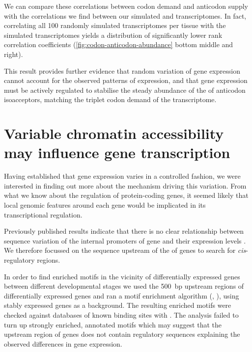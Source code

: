 We can compare these correlations between \mrna codon demand and \trna anticodon
supply with the correlations we find between our simulated \mrna and \trna
transcriptomes. In fact, correlating all \num{100} randomly simulated \trna
transcriptomes per tissue with the simulated \mrna transcriptomes yields a
distribution of significantly lower rank correlation coefficients
(\cref{fig:codon-anticodon-abundance} bottom middle and right).

This result provides further evidence that random variation of \trna gene
expression cannot account for the observed patterns of expression, and that
\trna gene expression must be actively regulated to stabilise the steady
abundance of the of \trna anticodon isoacceptors, matching the triplet codon
demand of the \mrna transcriptome.

\section{Variable chromatin accessibility may influence \trna gene transcription}

Having established that \trna gene expression varies in a controlled fashion, we
were interested in finding out more about the mechanism driving this variation.
From what we know about the regulation of protein-coding genes, it seemed likely
that local genomic features around each \trna gene would be implicated in its
transcriptional regulation.

Previously published results indicate that there is no clear relationship
between sequence variation of the internal promoters of \trna gene and their
expression levels \citep{Oler:2010,Canella:2012}. We therefore focussed on the
sequence upstream of the \tss of \trna genes to search for \emph{cis}-regulatory
regions.

In order to find enriched motifs in the vicinity of differentially expressed
\trna genes between different developmental stages we used the \SI{500}{bp}
upstream regions of differentially expressed \trna genes and ran a motif
enrichment algorithm (, \citet{Bailey:2009}), using stably expressed
\trna genes as a background. The resulting enriched motifs were checked against
databases of known \tf binding sites with  \citep{Gupta:2007}. The
analysis failed to turn up strongly enriched, annotated motifs which may suggest
that the upstream region of \trna genes does not contain regulatory sequences
explaining the observed differences in \trna gene expression.

